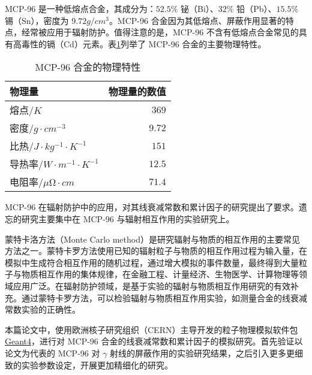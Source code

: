 MCP-96 是一种低熔点合金，其成分为：$52.5\%$ 铋（Bi）、$32\%$ 铅（Pb）、$15.5\%$ 锡（Sn），密度为 $9.72\si{g/cm^3}$。MCP-96 合金因为其低熔点、屏蔽作用显著的特点，经常被应用于辐射防护。值得注意的是，MCP-96 不含有低熔点合金常见的具有高毒性的镉（Cd）元素。表\ref{tab:mcp96}列举了 MCP-96 合金的主要物理特性\cite{hopkins_linear_2012}。

\begin{table}[H]
    \centering
    \caption{MCP-96 合金的物理特性}
    \label{tab:mcp96}
    \begin{tabular}{l|r}
    \toprule
    物理量 & 物理量的数值 \\ 
    \hline
    熔点/$\si{K}$ & $369$ \\
    \hline
    密度/$\si{g\cdot cm^{-3}}$ & $9.72$ \\
    \hline
    比热/$\si{J\cdot kg^{-1}\cdot K^{-1}}$ & $151$ \\
    \hline
    导热率/$\si{W\cdot m^{-1}\cdot K^{-1}}$ & $12.5$ \\
    \hline
    电阻率/$\si{\mu\ohm\cdot cm}$ & $71.4$ \\
    \bottomrule
    \end{tabular}
\end{table}

MCP-96 在辐射防护中的应用，对其线衰减常数和累计因子的研究提出了要求。遗忘的研究主要集中在 MCP-96 与辐射相互作用的实验研究上\cite{hopkins_linear_2012}。

蒙特卡洛方法（Monte Carlo method）是研究辐射与物质的相互作用的主要常见方法之一。蒙特卡罗方法使用已知的辐射粒子与物质的相互作用过程为输入量，在模拟中生成符合相互作用的随机过程，通过增大模拟的事件数量，最终得到大量粒子与物质相互作用的集体规律，在金融工程、计量经济、生物医学、计算物理等领域应用广泛。在辐射防护领域，是基于实验的辐射与物质相互作用研究的有效补充。通过蒙特卡罗方法，可以检验辐射与物质相互作用实验，如测量合金的线衰减常数实验的正确性。

本篇论文中，使用欧洲核子研究组织（CERN）主导开发的粒子物理模拟软件包 \href{https://geant4.web.cern.ch/}{Geant4}\cite{agostinelli_geant4simulation_2003,allison_geant4_2006}，进行对 MCP-96 合金的线衰减常数和累计因子的模拟研究。首先验证以论文\cite{hopkins_linear_2012}为代表的 MCP-96 对 $\gamma$ 射线的屏蔽作用的实验研究结果，之后引入更多更细致的实验参数设定，开展更加精细化的研究。
